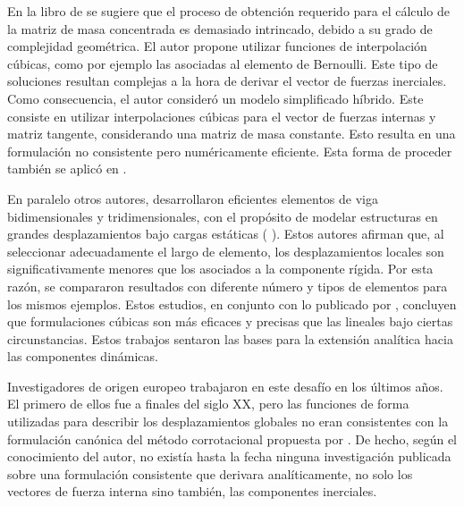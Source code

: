 En la libro de \cite{Crisfield} se sugiere que el proceso de obtención requerido para el cálculo de la matriz de masa concentrada es demasiado intrincado, debido a su grado de complejidad geométrica. El autor propone utilizar funciones de interpolación cúbicas, como por ejemplo las asociadas al elemento de Bernoulli. Este tipo de soluciones resultan complejas a la hora de derivar el vector de fuerzas inerciales. Como consecuencia, el autor consideró un modelo simplificado híbrido. Este consiste en utilizar interpolaciones cúbicas para el vector de fuerzas internas y matriz tangente, considerando una matriz de masa constante. Esto resulta en una formulación no consistente pero numéricamente eficiente.  Esta forma de proceder también se aplicó en \cite{pacoste1997beam}.

En paralelo otros autores, desarrollaron eficientes elementos de viga bidimensionales y tridimensionales, con el propósito de modelar estructuras en grandes desplazamientos bajo cargas estáticas (\cite{Battini2002} \cite{alsafadie2010corotational}).
Estos autores afirman que, al seleccionar adecuadamente el largo de elemento, los desplazamientos locales son significativamente menores que los asociados a la componente rígida. Por esta razón, se compararon resultados con diferente número y tipos de elementos para los mismos ejemplos. Estos estudios, en conjunto con lo publicado por \cite{alsafadie2010corotational}, concluyen que formulaciones cúbicas son más eficaces y precisas que las lineales bajo ciertas circunstancias. Estos trabajos sentaron las bases para la extensión analítica hacia las componentes dinámicas.

Investigadores de origen europeo trabajaron en este desafío en los últimos años. El primero de ellos fue \cite{behdinan1998co} a finales del siglo XX, pero las funciones de forma utilizadas para describir los desplazamientos globales no eran consistentes con la formulación canónica del método corrotacional propuesta por \cite{simo1988dynamics}. De hecho, según el conocimiento del autor, no existía hasta la fecha ninguna investigación publicada sobre una formulación consistente que derivara analíticamente, no solo los vectores de fuerza interna sino también, las componentes inerciales.   

